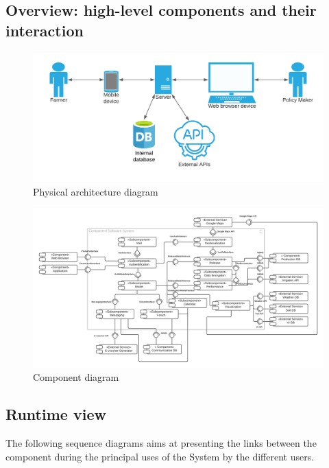 \subsection{Overview: high-level components and their interaction}


\begin{figure} [!h]
	\centering
	\includegraphics[width=\textwidth]{Images/architecture-diagram.png}
	\caption{\label{fig:physical_diag} Physical architecture diagram}
\end{figure}

\begin{figure} [!h]
	\centering
	\includegraphics[width=\textwidth]{Images/component-diagram.png}
	\caption{\label{fig:component_diag} Component diagram}
\end{figure}

\subsection{Runtime view}
The following sequence diagrams aims at presenting the links between the component during the principal uses of the System by the different users.

